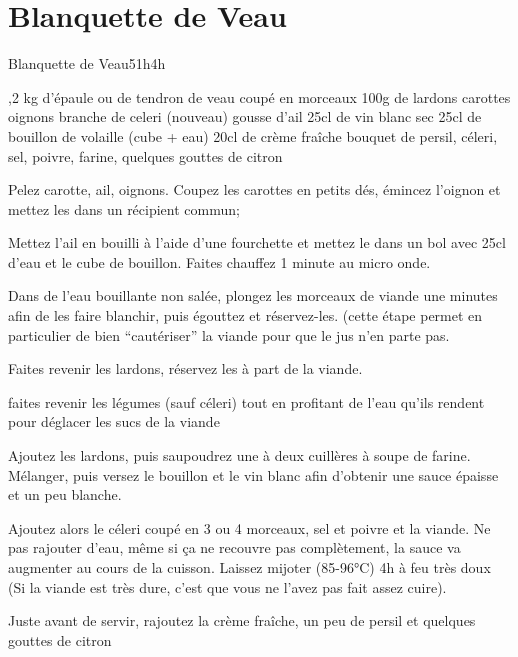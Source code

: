 {\section{Blanquette de Veau}
\begin{recette}{Blanquette de Veau}{5}{1h}{4h}
\begin{ingredients}
,2 kg d'épaule ou de tendron de veau coupé en morceaux
\ingredient 100g de lardons
 carottes
 oignons
 branche de celeri (nouveau)
 gousse d'ail
\ingredient 25cl de vin blanc sec
\ingredient 25cl de bouillon de volaille (cube + eau)
\ingredient 20cl de crème fraîche
 bouquet de persil, céleri, sel, poivre, farine, quelques gouttes de citron
\end{ingredients}

\begin{preparation}
\etape Pelez carotte, ail, oignons. Coupez les carottes en petits dés, émincez l'oignon et mettez les dans un récipient commun;

\etape Mettez l'ail en bouilli à l'aide d'une fourchette et mettez le dans un bol avec 25cl d'eau et le cube de bouillon. 
Faites chauffez 1 minute au micro onde.

\etape Dans de l'eau bouillante non salée, plongez les morceaux de viande une minutes afin de les faire blanchir, puis égouttez et réservez-les. (cette étape permet en particulier de bien ``cautériser'' la viande pour que le jus n'en parte pas.

\etape Faites revenir les lardons, réservez les à part de la viande. 

\etape faites revenir les légumes (sauf céleri) tout en profitant de l'eau qu'ils rendent pour déglacer les sucs de la viande

\etape Ajoutez les lardons, puis saupoudrez une à deux cuillères à soupe de farine. Mélanger, puis versez le bouillon et le vin 
blanc afin d'obtenir une sauce épaisse et un peu blanche. 

\etape Ajoutez alors le céleri coupé en 3 ou 4 morceaux, sel et poivre et la viande. Ne pas rajouter d'eau, même si ça ne recouvre pas complètement, la sauce va augmenter au cours de la cuisson. Laissez mijoter (85-96°C) 4h à feu très doux (Si la viande est 
très dure, c'est 
que vous ne l'avez pas fait assez cuire). 

\etape Juste avant de servir, rajoutez la crème fraîche, un peu de persil et quelques gouttes de citron
\end{preparation}
\end{recette}

}
